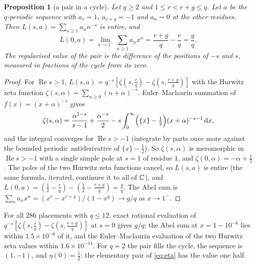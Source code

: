 \documentclass[11pt]{article}
\newtheorem{proposition}[theorem]{Proposition}
\theoremstyle{definition}\newtheorem{definition}[theorem]{Definition}
\theoremstyle{remark}\newtheorem{remark}[theorem]{Remark}
\newcommand{\dd}{\,\mathrm d}\newcommand{\e}{\mathrm e}
\renewcommand{\Re}{\operatorname{Re}}\renewcommand{\Im}{\operatorname{Im}}
\begin{document}
\begin{proposition}[a pair in a cycle]\label{prop:cycle}
Let $q\ge2$ and $1\le r<r+g\le q$. Let $a$ be the $q$-periodic sequence with $a_r=1$, $a_{r+g}=-1$ and $a_n=0$ at the other residues. Then $L(s,a)=\sum_{n\ge1}a_nn^{-s}$ is entire, and
\[
L(0,a)=\lim_{x\to1^-}\sum_{n\ge1}a_nx^n=\frac{r+g}{q}-\frac rq=\frac gq .
\]
The regularised value of the pair is the difference of the positions of $-s$ and $s$, measured in fractions of the cycle from its zero.
\end{proposition}
\begin{proof}
For $\Re s>1$, $L(s,a)=q^{-s}[\zeta(s,\tfrac rq)-\zeta(s,\tfrac{r+g}q)]$ with the Hurwitz zeta function $\zeta(s,\alpha)=\sum_{n\ge0}(n+\alpha)^{-s}$. Euler--Maclaurin summation of $f(x)=(x+\alpha)^{-s}$ gives
\[
\zeta(s,\alpha)=\frac{\alpha^{1-s}}{s-1}+\frac{\alpha^{-s}}2-s\int_0^\infty\Bigl(\{x\}-\tfrac12\Bigr)(x+\alpha)^{-s-1}\dd x ,
\]
and the integral converges for $\Re s>-1$ (integrate by parts once more against the bounded periodic antiderivative of $\{x\}-\frac12$). So $\zeta(s,\alpha)$ is meromorphic in $\Re s>-1$ with a single simple pole at $s=1$ of residue $1$, and $\zeta(0,\alpha)=-\alpha+\tfrac12$. The poles of the two Hurwitz zeta functions cancel, so $L(s,a)$ is entire (the same formula, iterated, continues it to all of $\mathbb C$), and $L(0,a)=(\tfrac12-\tfrac rq)-(\tfrac12-\tfrac{r+g}q)=\tfrac gq$. The Abel sum is $\sum_na_nx^n=(x^r-x^{r+g})/(1-x^q)\to g/q$ as $x\to1^-$.
\end{proof}
For all $286$ placements with $q\le12$, exact rational evaluation of $q^{-s}[\zeta(s,\frac rq)-\zeta(s,\frac{r+g}q)]$ at $s=0$ gives $g/q$; the Abel sum at $x=1-10^{-6}$ lies within $1.5\times10^{-6}$ of it, and the Euler--Maclaurin evaluation of the two Hurwitz zeta values within $1.6\times10^{-14}$. For $q=2$ the pair fills the cycle, the sequence is $(1,-1)$, and $\eta(0)=\tfrac12$: the elementary pair of \eqref{eq:eta} has the value one half.
\end{document}
